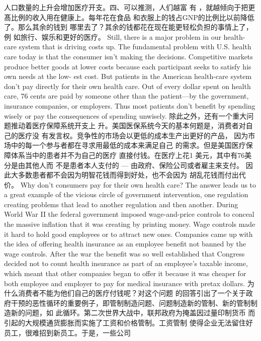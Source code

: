 \begin{paracol}{2}
人口数量的上升会增加医疗开支。四、可以推测，人们越富
有 ，就越倾向于把更髙比例的收入用在健康上。每年花在食品
和衣服上的钱占GNP的比例比以前降低了。那么其余的钱到
哪里去了？其余的钱都花在现在能更轻松负担的事情上了，例
如旅行、娱乐和更好的医疗。
\switchcolumn*
Still, there is a major problem in our health-care system that
is driving costs up. The fundamental problem with U.S. health
care today is that the consumer isn't making the decisions.
Competitive markets produce better goods at lower costs because each participant seeks to satisfy his own needs at the low-
est cost. But patients in the American health-care system don't
pay directly for their own health care. Out of every dollar spent
on health care, 76 cents are paid by someone other than the patient---by the government, insurance companies, or employers.
Thus most patients don't benefit by spending wisely or pay the
consequences of spending unwisely.
\switchcolumn
除此之外，还有一个重大问题推动着医疗保障系统开支上
升。美国医保系统今天的基本何题是，消费者对自己的医疗没
有发言权。竞争性的市场会以更低的成本生产出更好的产品，
因为市场中的每一个参与者都在寻求用最低的成本来满足自己
的需求。但是美国医疗保障体系当中的患者并不为自己的医疗
直接付钱。在医疗上花1 美元，其中有76美分是由其他人而
不是患者本人支付的 --- 由政府、保险公司或者雇主来支付。
因此大多数患者都不会因为明智花钱而得到好处，也不会因为
胡乱花钱而付出代价。
\switchcolumn*
Why don't consumers pay for their own health care? The answer leads us to a great example of the vicious circle of government intervention, one regulation creating problems that lead to another regulation and then another. During World War II
the federal government imposed wage-and-price controls to
conceal the massive inflation that it was creating by printing
money. Wage controls made it hard to hold good employees or
to attract new ones. Companies came up with the idea of offering health insurance as an employee benefit not banned by the
wage controls. After the war the benefit was so well established
that Congress decided not to count health insurance as part of
an employee's taxable income, which meant that other companies began to offer it because it was cheaper for both employee
and employer to pay for medical insurance with pretax dollars.
\switchcolumn
为什么消费者不能为他们自己的医疗付钱呢？对这个问题
的回答引出了一个关于政府干预的恶性循环的重要例子，即管制制造问题、问题制造新的管制、新的管制制造新的问题，如
此循环。第二次世界大战中，联邦政府为掩盖因过量印制货币
而引起的大规模通货膨胀而实施了工资和价格管制。工资管制
使得企业无法留住好员工，很难招到新员工。于是，一些公司

\end{paracol}
